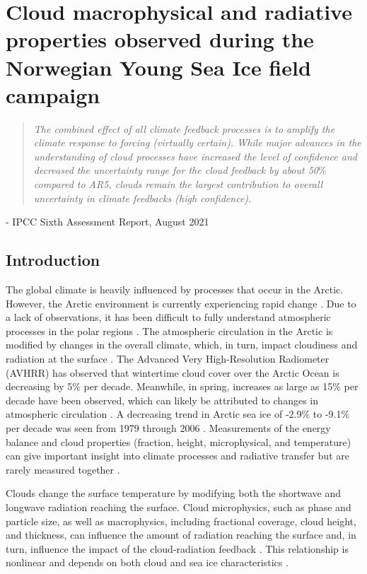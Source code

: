 \chapter{Cloud macrophysical and radiative properties observed during the Norwegian Young Sea Ice field campaign}
\vspace{1 cm}
\begin{spacing}{1} \begin{quote} 
\noindent \emph{The combined effect of all climate feedback processes is to amplify the climate response to forcing (virtually certain). While major advances in the understanding of cloud processes have increased the level of confidence and decreased the uncertainty range for the cloud feedback by about 50$\%$ compared to AR5, clouds remain the largest contribution to overall uncertainty in climate feedbacks (high confidence).} \end{quote}
\hspace{6 cm} - IPCC Sixth Assessment Report, August 2021  
\end{spacing}
\doublespacing
\section{Introduction}
The global climate is heavily influenced by processes that occur in the Arctic. However, the Arctic environment is currently experiencing rapid change \citep{overland:2011, stroeve:2007}. Due to a lack of observations, it has been difficult to fully understand atmospheric processes in the polar regions \citep{persson:2002}. The atmospheric circulation in the Arctic is modified by changes in the overall climate, which, in turn, impact cloudiness and radiation at the surface \citep{zhang:2008}. The Advanced Very High-Resolution Radiometer (AVHRR) has observed that wintertime cloud cover over the Arctic Ocean is decreasing by 5$\%$ per decade. Meanwhile, in spring, increases as large as 15$\%$ per decade have been observed, which can likely be attributed to changes in atmospheric circulation \citep{schweiger:2004}. A decreasing trend in Arctic sea ice of -2.9$\%$ to -9.1$\%$ per decade was seen from 1979 through 2006 \citep{stroeve:2007}. Measurements of the energy balance and cloud properties (fraction, height, microphysical, and temperature) can give important insight into climate processes and radiative transfer but are rarely measured together \citep{persson:2002, schweiger:2004, miller:2017}. 

Clouds change the surface temperature by modifying both the shortwave and longwave radiation reaching the surface. Cloud microphysics, such as phase and particle size, as well as macrophysics, including fractional coverage, cloud height, and thickness, can influence the amount of radiation reaching the surface and, in turn, influence the impact of the cloud-radiation feedback \citep{uttal:2002}. This relationship is nonlinear and depends on both cloud and sea ice characteristics \citep{intrieri:2002}.

